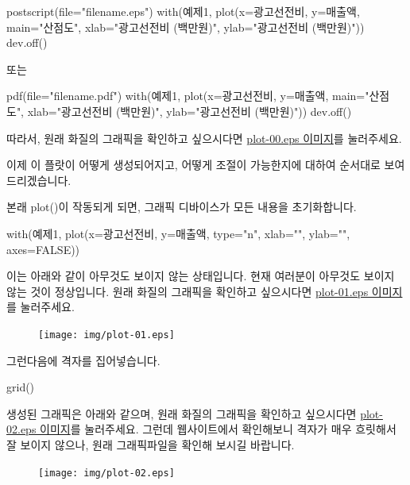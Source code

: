 \documentclass[../tutorial.tex]{subfiles}
\begin{document}
\begin{Schunk}
\begin{Soutput}	
postscript(file="filename.eps")
with(예제1, plot(x=광고선전비, y=매출액, main="산점도", xlab="광고선전비 (백만원)", ylab="광고선전비 (백만원)"))
dev.off()

또는 

pdf(file="filename.pdf")
with(예제1, plot(x=광고선전비, y=매출액, main="산점도", xlab="광고선전비 (백만원)", ylab="광고선전비 (백만원)"))
dev.off()
\end{Soutput}
\end{Schunk}


따라서, 원래 화질의 그래픽을 확인하고 싶으시다면 \href{http://korea.gnu.org/gnustats/img/plot-00.eps}{plot-00.eps 이미지}를 눌러주세요. 

이제 이 플랏이 어떻게 생성되어지고, 어떻게 조절이 가능한지에 대하여 순서대로 보여드리겠습니다.

본래 plot()이 작동되게 되면, 그래픽 디바이스가 모든 내용을 초기화합니다. 
\begin{Schunk}
\begin{Soutput}	
with(예제1, plot(x=광고선전비, y=매출액, type="n", xlab="", ylab="", axes=FALSE))
\end{Soutput}
\end{Schunk}

이는 아래와 같이 아무것도 보이지 않는 상태입니다. 
현재 여러분이 아무것도 보이지 않는 것이 정상입니다. 
원래 화질의 그래픽을 확인하고 싶으시다면 \href{http://korea.gnu.org/gnustats/img/plot-01.eps}{plot-01.eps 이미지}를 눌러주세요. 

\begin{figure}
\begin{center}
\texttt{[image: img/plot-01.eps]}
\end{center}
\end{figure}
 
 
그런다음에 격자를 집어넣습니다. 
\begin{Schunk}
\begin{Soutput}	
grid()
\end{Soutput}
\end{Schunk}
생성된 그래픽은 아래와 같으며, 원래 화질의 그래픽을 확인하고 싶으시다면 \href{http://korea.gnu.org/gnustats/img/plot-02.eps}{plot-02.eps 이미지}를 눌러주세요.
그런데 웹사이트에서 확인해보니 격자가 매우 흐릿해서 잘 보이지 않으나, 원래 그래픽파일을 확인해 보시길 바랍니다.  

\begin{figure}
\begin{center}
\texttt{[image: img/plot-02.eps]}
\end{center}
\end{figure}
\end{document}
